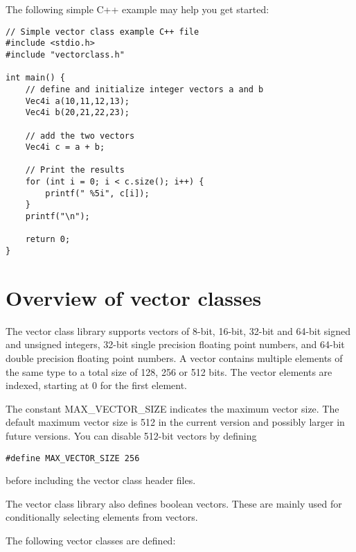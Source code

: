 \documentclass[vcl_manual.tex]{subfiles}
\begin{document}

The following simple C++ example may help you get started:

\begin{example}
\label{exampleArrayLoop3}
\end{example} 
\begin{lstlisting}[frame=single]
// Simple vector class example C++ file
#include <stdio.h>
#include "vectorclass.h"

int main() {
    // define and initialize integer vectors a and b
    Vec4i a(10,11,12,13);
    Vec4i b(20,21,22,23);

    // add the two vectors
    Vec4i c = a + b;

    // Print the results
    for (int i = 0; i < c.size(); i++) {
        printf(" %5i", c[i]);
    }
    printf("\n");

    return 0;
}
\end{lstlisting}

\section{Overview of vector classes} \label{OverviewOfVectorClasses}
The vector class library supports vectors of 8-bit, 16-bit, 32-bit and 64-bit signed and unsigned integers, 32-bit single precision floating point numbers, and 64-bit double precision floating point numbers. A vector contains multiple elements of the same type to a total size of 128, 256 or 512 bits. The vector elements are indexed, starting at 0 for the first element.

The constant MAX\_VECTOR\_SIZE indicates the maximum vector size. The default maximum vector size is 512 in the current version and possibly larger in future versions. You can disable 512-bit vectors by defining
\begin{lstlisting}[frame=none]
    #define MAX_VECTOR_SIZE 256
\end{lstlisting}
before including the vector class header files.

The vector class library also defines boolean vectors. These are mainly used for conditionally selecting elements from vectors.

The following vector classes are defined:
\end{document}
